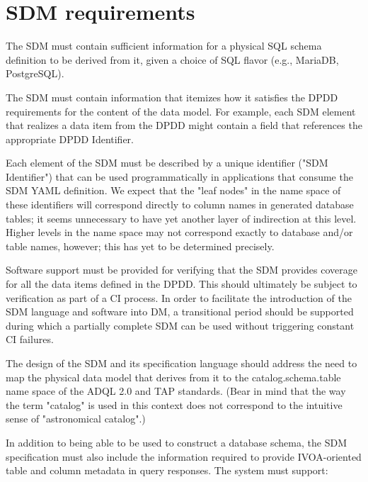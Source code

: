 

\section{SDM requirements}\label{sec:sdm}
The SDM must contain sufficient information for a physical SQL schema definition to be derived from it, given a choice of SQL flavor (e.g., MariaDB, PostgreSQL).

The SDM must contain information that itemizes how it satisfies the DPDD requirements for the content of the data model.  For example, each SDM element that realizes a data item from the DPDD might contain a field that references the appropriate DPDD Identifier.

Each element of the SDM must be described by a unique identifier ("SDM Identifier") that can be used programmatically in applications that consume the SDM YAML definition.  We expect that the "leaf nodes" in the name space of these identifiers will correspond directly to column names in generated database tables; it seems unnecessary to have yet another layer of indirection at this level.  Higher levels in the name space may not correspond exactly to database and/or table names, however; this has yet to be determined precisely.

Software support must be provided for verifying that the SDM provides coverage for all the data items defined in the DPDD.  This should ultimately be subject to verification as part of a CI process.  In order to facilitate the introduction of the SDM language and software into DM, a transitional period should be supported during which a partially complete SDM can be used without triggering constant CI failures.

The design of the SDM and its specification language should address the need to map the physical data model that derives from it to the catalog.schema.table name space of the ADQL 2.0 and TAP standards.  (Bear in mind that the way the term "catalog" is used in this context does not correspond to the intuitive sense of "astronomical catalog".)

In addition to being able to be used to construct a database schema, the SDM specification must also include the information required to provide IVOA-oriented table and column metadata in query responses.  The system must support:

